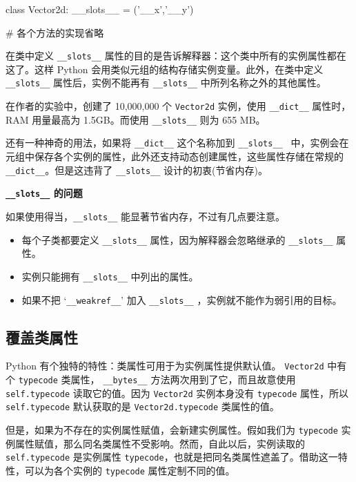\begin{python}
class Vector2d:
    __slots__ = ('__x','__y')

    # 各个方法的实现省略
\end{python}

在类中定义 \texttt{\_\_slots\_\_} 属性的目的是告诉解释器：这个类中所有的实例属性都在这了。这样 Python 会用类似元组的结构存储实例变量。此外，在类中定义 \texttt{\_\_slots\_\_} 属性后，实例不能再有 \texttt{\_\_slots\_\_} 中所列名称之外的其他属性。

在作者的实验中，创建了 10,000,000 个 \texttt{Vector2d} 实例，使用 \texttt{\_\_dict\_\_} 属性时，RAM 用量最高为 1.5GB。而使用 \texttt{\_\_slots\_\_} 则为 655 MB。

还有一种神奇的用法，如果将 \texttt{\_\_dict\_\_} 这个名称加到 \texttt{\_\_slots\_\_ } 中，实例会在元组中保存各个实例的属性，此外还支持动态创建属性，这些属性存储在常规的 \texttt{\_\_dict\_\_}。但是这违背了 \texttt{\_\_slots\_\_} 设计的初衷(节省内存)。

\noindent\textbf{\texttt{\_\_slots\_\_} 的问题}

如果使用得当，\texttt{\_\_slots\_\_} 能显著节省内存，不过有几点要注意。
\begin{itemize}
    \item 每个子类都要定义 \texttt{\_\_slots\_\_} 属性，因为解释器会忽略继承的 \texttt{\_\_slots\_\_} 属性。
    \item 实例只能拥有 \texttt{\_\_slots\_\_} 中列出的属性。
    \item 如果不把 `\texttt{\_\_weakref\_\_}' 加入 \texttt{\_\_slots\_\_} ，实例就不能作为弱引用的目标。
\end{itemize}

\subsection{覆盖类属性}

Python 有个独特的特性：类属性可用于为实例属性提供默认值。 \texttt{Vector2d} 中有个 \texttt{typecode} 类属性， \texttt{\_\_bytes\_\_} 方法两次用到了它，而且故意使用 \texttt{self.typecode} 读取它的值。因为 \texttt{Vector2d} 实例本身没有 \texttt{typecode} 属性，所以 \texttt{self.typecode} 默认获取的是 \texttt{Vector2d.typecode} 类属性的值。

但是，如果为不存在的实例属性赋值，会新建实例属性。假如我们为 \texttt{typecode} 实例属性赋值，那么同名类属性不受影响。然而，自此以后，实例读取的 \texttt{self.typecode} 是实例属性 \texttt{typecode}，也就是把同名类属性遮盖了。借助这一特性，可以为各个实例的 \texttt{typecode} 属性定制不同的值。

